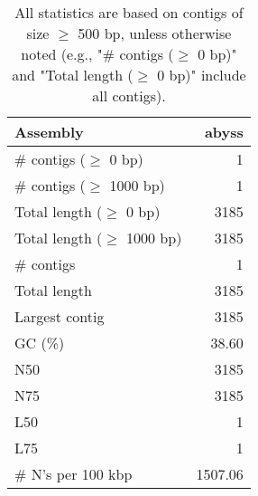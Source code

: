 \documentclass[12pt,a4paper]{article}
\begin{document}
\begin{table}[ht]
\begin{center}
\caption{All statistics are based on contigs of size $\geq$ 500 bp, unless otherwise noted (e.g., "\# contigs ($\geq$ 0 bp)" and "Total length ($\geq$ 0 bp)" include all contigs).}
\begin{tabular}{|l*{1}{|r}|}
\hline
Assembly & abyss \\ \hline
\# contigs ($\geq$ 0 bp) & 1 \\ \hline
\# contigs ($\geq$ 1000 bp) & 1 \\ \hline
Total length ($\geq$ 0 bp) & 3185 \\ \hline
Total length ($\geq$ 1000 bp) & 3185 \\ \hline
\# contigs & 1 \\ \hline
Total length & 3185 \\ \hline
Largest contig & 3185 \\ \hline
GC (\%) & 38.60 \\ \hline
N50 & 3185 \\ \hline
N75 & 3185 \\ \hline
L50 & 1 \\ \hline
L75 & 1 \\ \hline
\# N's per 100 kbp & 1507.06 \\ \hline
\end{tabular}
\end{center}
\end{table}
\end{document}
